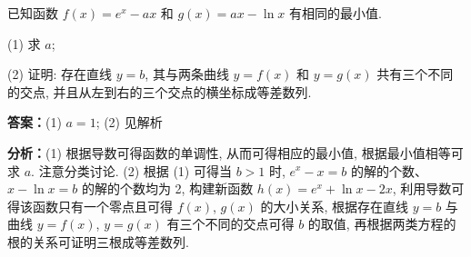 \begin{question}[points=12]
已知函数 $f(x) = e^x - ax$ 和 $g(x) = ax - \ln x$ 有相同的最小值.

(1) 求 $a$;

(2) 证明: 存在直线 $y = b$, 其与两条曲线 $y = f(x)$ 和 $y = g(x)$ 共有三个不同的交点, 并且从左到右的三个交点的横坐标成等差数列.
\begin{solution}
\textbf{答案：}(1) $a = 1$; (2) 见解析

\textbf{分析：}(1) 根据导数可得函数的单调性, 从而可得相应的最小值, 根据最小值相等可求 $a$. 注意分类讨论. (2) 根据 (1) 可得当 $b > 1$ 时, $e^x - x = b$ 的解的个数、 $x - \ln x = b$ 的解的个数均为 2, 构建新函数 $h(x) = e^x + \ln x - 2x$, 利用导数可得该函数只有一个零点且可得 $f(x)$, $g(x)$ 的大小关系, 根据存在直线 $y = b$ 与曲线 $y = f(x)$, $y = g(x)$ 有三个不同的交点可得 $b$ 的取值, 再根据两类方程的根的关系可证明三根成等差数列.


\end{solution}
\end{question}
